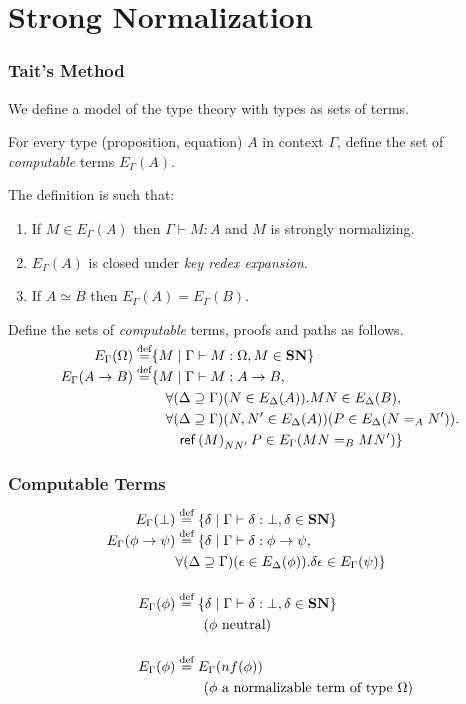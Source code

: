\documentclass[handout]{beamer}
\newcommand{\eqdef}{\mathrel{\smash{\stackrel{\text{def}}{=}}}}
\newcommand{\reff}[1]{\ensuremath{\mathsf{ref} \left( {#1} \right)}}
\newcommand{\SN}{\ensuremath{\mathbf{SN}}}
\begin{document}
\section{Strong Normalization}

\begin{frame}
\frametitle{Tait's Method}

We define a model of the type theory with types as sets of terms.

For every type (proposition, equation) $A$ in context $\Gamma$, define
the set of \emph{computable} terms $E_\Gamma(A)$.

The definition is such that:
\begin{enumerate}
\item
If $M \in E_\Gamma(A)$ then $\Gamma \vdash M : A$ and $M$ is strongly normalizing.
\item
$E_\Gamma(A)$ is closed under \emph{key redex expansion}.
\item
If $A \simeq B$ then $E_\Gamma(A) = E_\Gamma(B)$.
\end{enumerate}
\end{frame}

\begin{frame}
Define the sets of \emph{computable} terms, proofs and paths as follows.
\begin{align*}
E_\Gamma(\Omega) \eqdef & \{ M \mid \Gamma \vdash M : \Omega, M \in \SN \} \\
E_\Gamma(A \rightarrow B) \eqdef & \{ M \mid \Gamma \vdash M : A \rightarrow B, \\
& \quad \forall (\Delta \supseteq \Gamma) (N \in E_\Delta(A)). MN \in E_\Delta(B), \\
& \quad \forall (\Delta \supseteq \Gamma) (N, N' \in E_\Delta(A)) (P \in E_\Delta(N =_A N')). \\
& \quad \quad \reff{M}_{N N'} P \in E_\Gamma(MN =_B MN') \}
\end{align*}
\end{frame}

\begin{frame}
\frametitle{Computable Terms}
\begin{align*}
E_\Gamma(\bot) & \eqdef \{ \delta \mid \Gamma \vdash \delta : \bot, \delta \in \SN \} \\
E_\Gamma(\phi \rightarrow \psi) & \eqdef \{ \delta \mid \Gamma \vdash \delta : \phi \rightarrow \psi, \\
& \forall (\Delta \supseteq \Gamma)(\epsilon \in E_\Delta(\phi)). \delta \epsilon \in E_\Gamma(\psi) \} \\
\\
E_\Gamma(\phi) & \eqdef \{ \delta \mid \Gamma \vdash \delta : \bot, \delta \in \SN \} \\
& \qquad (\phi \text{ neutral}) \\
\\
E_\Gamma(\phi) & \eqdef E_\Gamma(nf(\phi)) \\
& \qquad (\phi \mbox{ a normalizable term of type $\Omega$})
\end{align*}
\end{frame}
\end{document}
